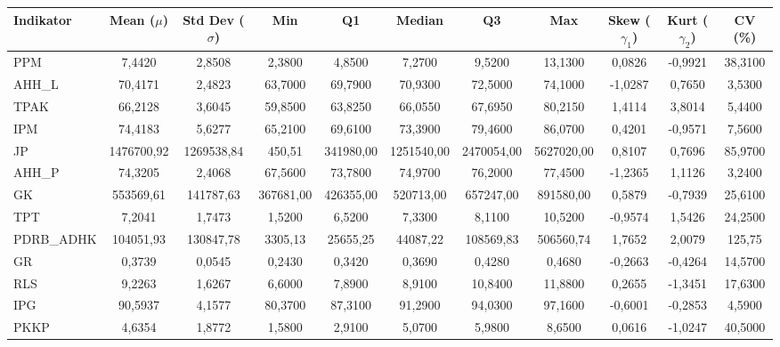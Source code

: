 \begin{adjustbox}{max width=\textwidth}
\small
\begin{tabular}{|>{\centering\arraybackslash}p{2.5cm}|c|c|c|c|c|c|c|c|c|c|}
\hline
\textbf{Indikator} & \textbf{Mean ($\mu$)} & \textbf{Std Dev ($\sigma$)} & \textbf{Min} & \textbf{Q1} & \textbf{Median} & \textbf{Q3} & \textbf{Max} & \textbf{Skew ($\gamma_1$)} & \textbf{Kurt ($\gamma_2$)} & \textbf{CV (\%)} \\
\hline
PPM & 7,4420 & 2,8508 & 2,3800 & 4,8500 & 7,2700 & 9,5200 & 13,1300 & 0,0826 & -0,9921 & 38,3100 \\
AHH\_L & 70,4171 & 2,4823 & 63,7000 & 69,7900 & 70,9300 & 72,5000 & 74,1000 & -1,0287 & 0,7650 & 3,5300 \\
TPAK & 66,2128 & 3,6045 & 59,8500 & 63,8250 & 66,0550 & 67,6950 & 80,2150 & 1,4114 & 3,8014 & 5,4400 \\
IPM & 74,4183 & 5,6277 & 65,2100 & 69,6100 & 73,3900 & 79,4600 & 86,0700 & 0,4201 & -0,9571 & 7,5600 \\
JP & 1476700,92 & 1269538,84 & 450,51 & 341980,00 & 1251540,00 & 2470054,00 & 5627020,00 & 0,8107 & 0,7696 & 85,9700 \\
AHH\_P & 74,3205 & 2,4068 & 67,5600 & 73,7800 & 74,9700 & 76,2000 & 77,4500 & -1,2365 & 1,1126 & 3,2400 \\
GK & 553569,61 & 141787,63 & 367681,00 & 426355,00 & 520713,00 & 657247,00 & 891580,00 & 0,5879 & -0,7939 & 25,6100 \\
TPT & 7,2041 & 1,7473 & 1,5200 & 6,5200 & 7,3300 & 8,1100 & 10,5200 & -0,9574 & 1,5426 & 24,2500 \\
PDRB\_ADHK & 104051,93 & 130847,78 & 3305,13 & 25655,25 & 44087,22 & 108569,83 & 506560,74 & 1,7652 & 2,0079 & 125,75 \\
GR & 0,3739 & 0,0545 & 0,2430 & 0,3420 & 0,3690 & 0,4280 & 0,4680 & -0,2663 & -0,4264 & 14,5700 \\
RLS & 9,2263 & 1,6267 & 6,6000 & 7,8900 & 8,9100 & 10,8400 & 11,8800 & 0,2655 & -1,3451 & 17,6300 \\
IPG & 90,5937 & 4,1577 & 80,3700 & 87,3100 & 91,2900 & 94,0300 & 97,1600 & -0,6001 & -0,2853 & 4,5900 \\
PKKP & 4,6354 & 1,8772 & 1,5800 & 2,9100 & 5,0700 & 5,9800 & 8,6500 & 0,0616 & -1,0247 & 40,5000 \\
\hline
\end{tabular}
\end{adjustbox}
